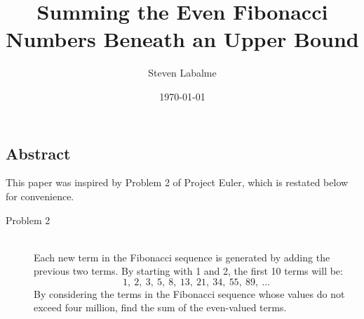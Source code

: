 \documentclass[titlepage]{article}
\title{Summing the Even Fibonacci Numbers Beneath an Upper Bound}
\author{Steven Labalme}
\date{\today}
\begin{document}
\maketitle



\tableofcontents
\newpage



\pagestyle{fancy}
\fancyhf{}
\renewcommand{\headrulewidth}{0pt}
\begin{center}
    \setcounter{secnumdepth}{0}
    \section{Abstract}
    \setcounter{secnumdepth}{3}
\end{center}
This paper was inspired by Problem 2 of Project Euler, which is restated below for convenience.

\vspace{8pt}
\begin{prob}
    \begin{description}
        \item[Problem 2] \hfill \\ Each new term in the Fibonacci sequence is generated by adding the previous two terms. By starting with 1 and 2, the first 10 terms will be:
        \begin{equation*}
            1,\ 2,\ 3,\ 5,\ 8,\ 13,\ 21,\ 34,\ 55,\ 89,\ \dots
        \end{equation*}
        By considering the terms in the Fibonacci sequence whose values do not exceed four million, find the sum of the even-valued terms.
    \end{description}
\end{prob}
\end{document}
